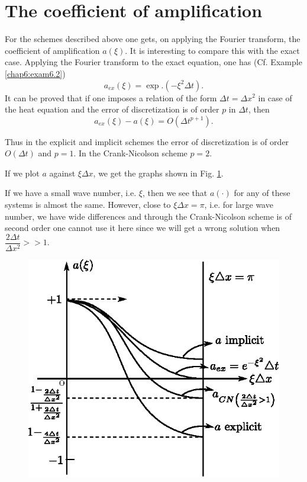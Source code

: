 \section{The coefficient of amplification}\label{chap7:sec7.4}

For the schemes described above one gets, on applying the Fourier
transform, the coefficient of amplification $a(\xi)$. It is
interesting to compare this with the exact case. Applying the Fourier
transform to the exact equation, one has (Cf. Example \ref{chap6:exam6.2})
\begin{equation*}
a_{ex} (\xi) = \exp. (-\xi^2 \Delta t). 
\tag{7.14}\label{eq7.14}
\end{equation*}
It can be proved that if one imposes a relation of the form $\Delta t
= \Delta x^2$ in case of the heat equation and the error of
discretization is of order $p$ in $\Delta t$, then 
$$
a_{ex}(\xi) - a(\xi) = O(\Delta t^{p+1}). 
$$

Thus in the explicit and implicit schemes the error of discretization
is of order $O(\Delta t)$ and $p=1$. In the Crank-Nicolson scheme
$p=2$.

If we plot $a$ against $\xi \Delta x$, we get the graphs shown in
Fig. \ref{c7:fig7.1}. 

If we have a small wave number, i.e. $\xi$, then we see that
$a(\cdot)$ for any of these systems is almost the same. However, close
to $\xi \Delta x = \pi$, i.e. for large wave number, we have wide
differences and through the Crank-Nicolson scheme is of second order
one cannot use it here since we will get a wrong solution when 
$\dfrac{2\Delta t}{\Delta x^2} >>1$.

\begin{figure}[H]
\centering
\includegraphics{figures/fig52-7.1.eps}
\caption{}\label{c7:fig7.1}
\end{figure}\pageoriginale

